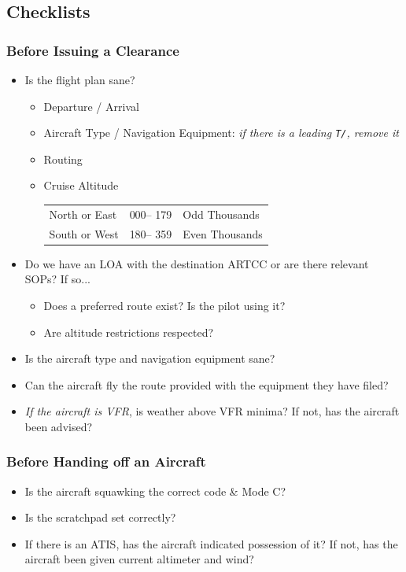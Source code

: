 \documentclass[fontsize=10pt, paper=letter]{article}
\begin{document}
\subsection{Checklists}

\subsubsection{Before Issuing a Clearance}

\begin{itemize}
	\item Is the flight plan sane?
	\begin{itemize}
		\item Departure / Arrival
		\item Aircraft Type / Navigation Equipment: \emph{if there is a leading \texttt{T/}, remove it}
		\item Routing
		\item Cruise Altitude

		\begin{tabu}{lll}
			North or East & 000\degree -- 179\degree & Odd Thousands \\
			South or West & 180\degree -- 359\degree & Even Thousands
		\end{tabu}
	\end{itemize}

	\item Do we have an LOA with the destination ARTCC or are there relevant SOPs? If so...
	\begin{itemize}
		\item Does a preferred route exist? Is the pilot using it?
		\item Are altitude restrictions respected?
	\end{itemize}
	\item Is the aircraft type and navigation equipment sane?
	\item Can the aircraft fly the route provided with the equipment they have filed?
	\item \emph{If the aircraft is VFR}, is weather above VFR minima? If not, has the aircraft been advised?
\end{itemize}

\subsubsection{Before Handing off an Aircraft}

\begin{itemize}
	\item Is the aircraft squawking the correct code \& Mode C?
	\item Is the scratchpad set correctly?
	\item If there is an ATIS, has the aircraft indicated possession of it? If not, has the aircraft been given current altimeter and wind?
\end{itemize}
\end{document}
